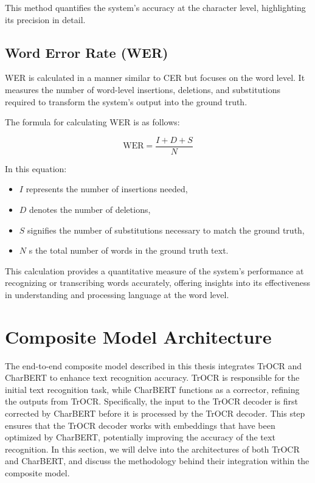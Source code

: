 This method quantifies the system's accuracy at the character level, highlighting its precision in detail.

\subsection{Word Error Rate (WER)}
\label{subsec:5_wer}
WER is calculated in a manner similar to CER but focuses on the word level. It measures the number of word-level insertions, deletions, and substitutions required to transform the system's output into the ground truth.

The formula for calculating WER is as follows:

\begin{equation}
    \text{WER} = \frac{I+D+S}{N}
\end{equation}

In this equation:
\begin{itemize}
    \item $I$ represents the number of insertions needed,
    \item $D$ denotes the number of deletions,
    \item $S$ signifies the number of substitutions necessary to match the ground truth,
    \item $N$ s the total number of words in the ground truth text.
\end{itemize}

This calculation provides a quantitative measure of the system's performance at recognizing or transcribing words accurately, offering insights into its effectiveness in understanding and processing language at the word level.
\section{Composite Model Architecture}
\label{sec:3_composite_model_architecture}
The end-to-end composite model described in this thesis integrates TrOCR and CharBERT to enhance text recognition accuracy. TrOCR is responsible for the initial text recognition task, while CharBERT functions as a corrector, refining the outputs from TrOCR. Specifically, the input to the TrOCR decoder is first corrected by CharBERT before it is processed by the TrOCR decoder. This step ensures that the TrOCR decoder works with embeddings that have been optimized by CharBERT, potentially improving the accuracy of the text recognition. In this section, we will delve into the architectures of both TrOCR and CharBERT, and discuss the methodology behind their integration within the composite model.

